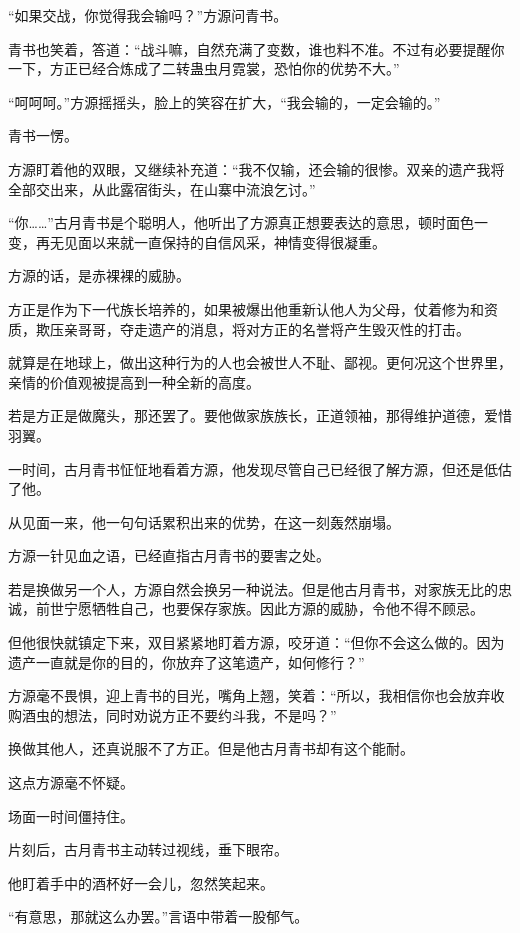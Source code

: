 \begin{this_body}
“如果交战，你觉得我会输吗？”方源问青书。

青书也笑着，答道：“战斗嘛，自然充满了变数，谁也料不准。不过有必要提醒你一下，方正已经合炼成了二转蛊虫月霓裳，恐怕你的优势不大。”

“呵呵呵。”方源摇摇头，脸上的笑容在扩大，“我会输的，一定会输的。”

青书一愣。

方源盯着他的双眼，又继续补充道：“我不仅输，还会输的很惨。双亲的遗产我将全部交出来，从此露宿街头，在山寨中流浪乞讨。”

“你……”古月青书是个聪明人，他听出了方源真正想要表达的意思，顿时面色一变，再无见面以来就一直保持的自信风采，神情变得很凝重。

方源的话，是赤裸裸的威胁。

方正是作为下一代族长培养的，如果被爆出他重新认他人为父母，仗着修为和资质，欺压亲哥哥，夺走遗产的消息，将对方正的名誉将产生毁灭性的打击。

就算是在地球上，做出这种行为的人也会被世人不耻、鄙视。更何况这个世界里，亲情的价值观被提高到一种全新的高度。

若是方正是做魔头，那还罢了。要他做家族族长，正道领袖，那得维护道德，爱惜羽翼。

一时间，古月青书怔怔地看着方源，他发现尽管自己已经很了解方源，但还是低估了他。

从见面一来，他一句句话累积出来的优势，在这一刻轰然崩塌。

方源一针见血之语，已经直指古月青书的要害之处。

若是换做另一个人，方源自然会换另一种说法。但是他古月青书，对家族无比的忠诚，前世宁愿牺牲自己，也要保存家族。因此方源的威胁，令他不得不顾忌。

但他很快就镇定下来，双目紧紧地盯着方源，咬牙道：“但你不会这么做的。因为遗产一直就是你的目的，你放弃了这笔遗产，如何修行？”

方源毫不畏惧，迎上青书的目光，嘴角上翘，笑着：“所以，我相信你也会放弃收购酒虫的想法，同时劝说方正不要约斗我，不是吗？”

换做其他人，还真说服不了方正。但是他古月青书却有这个能耐。

这点方源毫不怀疑。

场面一时间僵持住。

片刻后，古月青书主动转过视线，垂下眼帘。

他盯着手中的酒杯好一会儿，忽然笑起来。

“有意思，那就这么办罢。”言语中带着一股郁气。

\end{this_body}

